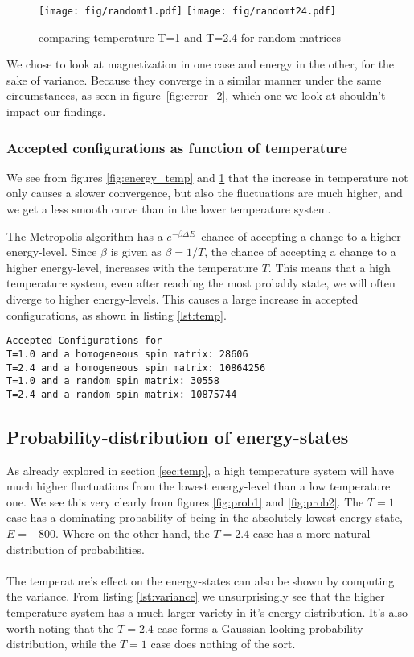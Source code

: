 \documentclass[10pt,a4paper]{article}
\begin{document}
\begin{figure}[H]
\texttt{[image: fig/randomt1.pdf]}
\texttt{[image: fig/randomt24.pdf]}
\caption{comparing temperature T=1 and T=2.4 for random matrices}
\label{fig:mag_temp}
\end{figure}
We chose to look at magnetization in one case and energy in the other, for the sake of variance. Because they converge in a similar manner under the same circumstances, as seen in figure \ref{fig:error_2}, which one we look at shouldn't impact our findings.

\subsubsection{Accepted configurations as function of temperature}
We see from figures \ref{fig:energy_temp} and \ref{fig:mag_temp} that the increase in temperature not only causes a slower convergence, but also the fluctuations are much higher, and we get a less smooth curve than in the lower temperature system.

The Metropolis algorithm has a $e^{-\beta \Delta E}$ chance of accepting a change to a higher energy-level. Since $\beta$ is given as $\beta = 1/T$, the chance of accepting a change to a higher energy-level, increases with the temperature $T$. This means that a high temperature system, even after reaching the most probably state, we will often diverge to higher energy-levels. This causes a large increase in accepted configurations, as shown in listing \ref{lst:temp}.
\pagebreak
\begin{lstlisting}[basicstyle=\footnotesize, frame=single, caption = Mean values against expectation values after $10^7$ Monte-Carlo cycles on a $2\times 2$ lattice, label=lst:temp]
Accepted Configurations for
T=1.0 and a homogeneous spin matrix: 28606
T=2.4 and a homogeneous spin matrix: 10864256
T=1.0 and a random spin matrix: 30558
T=2.4 and a random spin matrix: 10875744
\end{lstlisting}



\subsection{Probability-distribution of energy-states}
As already explored in section \ref{sec:temp}, a high temperature system will have much higher fluctuations from the lowest energy-level than a low temperature one. We see this very clearly from figures \ref{fig:prob1} and \ref{fig:prob2}. The $T=1$ case has a dominating probability of being in the absolutely lowest energy-state, $E = -800$. Where on the other hand, the $T=2.4$ case has a more natural distribution of probabilities.\\\\
The temperature's effect on the energy-states can also be shown by computing the variance. From listing \ref{lst:variance} we unsurprisingly see that the higher temperature system has a much larger variety in it's energy-distribution. It's also worth noting that the $T=2.4$ case forms a Gaussian-looking probability-distribution, while the $T=1$ case does nothing of the sort.
\end{document}
